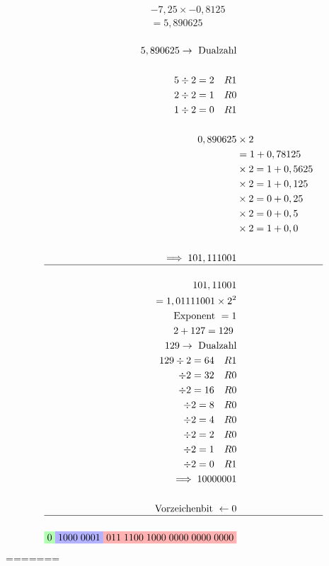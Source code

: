 \documentclass[a4paper]{scrartcl}
\begin{document}
			\begin{align*}
			&-7,25 \times -0,8125\\
			&= 5,890625\\
			\end{align*}
			
			\begin{align*}
			5,890625 \rightarrow \text{ Dualzahl}\\
			\\
			5 \div 2 = 2 \quad R 1\\
			2 \div 2 = 1 \quad R 0\\
			1 \div 2 = 0 \quad R 1\\
			\\
			0,890625 &\times 2\\ 
			&= 1+ 0,78125\\
			&\times 2 = 1 + 0,5625\\ 
			&\times 2 = 1 + 0,125\\ 
			&\times 2 = 0 + 0,25\\ 
			&\times 2 = 0 + 0,5\\ 
			&\times 2 = 1 + 0,0\\ 
			\\
			\implies 101,111001\\\hline
			\\
			101,11001\\
			= 1,01111001 \times 2^{2}\\
			\text{Exponent } = 1\\
			2 + 127 = 129\
			\\
			129 \rightarrow \text{ Dualzahl}\\
			129\div 2 = 64 \quad R1\\
			\div 2 = 32 \quad R0\\
			\div 2 = 16 \quad R0\\
			\div 2 = 8 \quad R0\\
			\div 2 = 4 \quad R0\\
			\div 2 = 2 \quad R0\\
			\div 2 = 1 \quad R0\\
			\div 2 = 0 \quad R1\\
			\implies 10000001\\
			\\
			\text{Vorzeichenbit } \gets 0\\ \hline
			\\ 
			\colorbox{green!30}{$0$} \colorbox{blue!30}{$1000 \; 0001$} \colorbox{red!30}{$011\; 1100\; 1000\; 0000\; 0000\; 0000$}\\
			\end{align*}
=======
							
\end{document}
